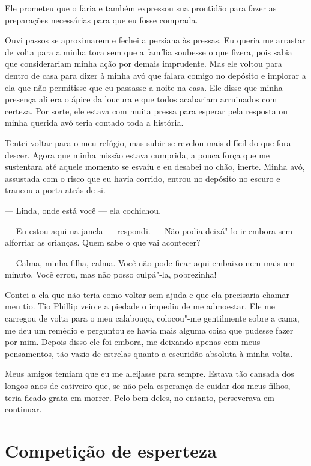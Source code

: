 Ele prometeu que o faria e também
expressou sua prontidão para fazer as preparações necessárias para que
eu fosse comprada.

Ouvi passos se aproximarem e fechei a
persiana às pressas. Eu queria me arrastar de volta para a minha toca
sem que a família soubesse o que fizera, pois sabia que considerariam
minha ação por demais imprudente. Mas ele voltou para dentro de casa
para dizer à minha avó que falara comigo no depósito e implorar a ela
que não permitisse que eu passasse a noite na casa. Ele disse que minha
presença ali era o ápice da loucura e que todos acabariam arruinados com
certeza. Por sorte, ele estava com muita pressa para esperar pela
resposta ou minha querida avó teria contado toda a história.

Tentei voltar para o meu refúgio, mas
subir se revelou mais difícil do que fora descer. Agora que minha missão
estava cumprida, a pouca força que me sustentara até aquele momento se
esvaiu e eu desabei no chão, inerte. Minha avó, assustada com o risco
que eu havia corrido, entrou no depósito no escuro e trancou a porta
atrás de si.

--- Linda, onde está você --- ela
cochichou.

--- Eu estou aqui na janela ---
respondi. --- Não podia deixá"-lo ir embora sem alforriar as crianças.
Quem sabe o que vai acontecer?

--- Calma, minha filha, calma. Você não
pode ficar aqui embaixo nem mais um minuto. Você errou, mas não posso
culpá"-la, pobrezinha!

Contei a ela que não teria como voltar sem ajuda e que ela precisaria
chamar meu tio. Tio Phillip veio e a piedade o impediu de me admoestar.
Ele me carregou de volta para o meu calabouço, colocou"-me gentilmente
sobre a cama, me deu um remédio e perguntou se havia mais alguma coisa
que pudesse fazer por mim. Depois disso ele foi embora, me deixando
apenas com meus pensamentos, tão vazio de estrelas quanto a escuridão
absoluta à minha volta.

Meus amigos temiam que eu me aleijasse
para sempre. Estava tão cansada dos longos anos de cativeiro que, se não
pela esperança de cuidar dos meus filhos, teria ficado grata em morrer.
Pelo bem deles, no entanto, perseverava em continuar.

\chapter*{Competição de esperteza}

